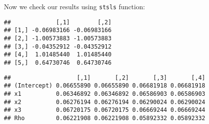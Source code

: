 Now we check our results using \texttt{stsls} function:
\begin{knitrout}
\color{fgcolor}\begin{kframe}
\begin{alltt}
 \hlkwb{<-}  \hlopt{~}  \hlopt{+}  \hlopt{+}     \hlstd{=}   \hlstd{=} \hlstd{))}
 \hlkwb{<-}  \hlopt{~}  \hlopt{+}  \hlopt{+}     \hlstd{=}   \hlstd{=} \hlstd{),}
                 \hlstd{=} \hlstd{,}  \hlstd{=} \hlstd{)}
\hlstd{(}\hlstd{(}\hlstd{(spreg1)[}\hlstd{(}\hlstd{,} \hlstd{,} \hlstd{,} \hlstd{,} \hlstd{)]),} \hlopt{$}
\end{alltt}
\begin{verbatim}
##             [,1]        [,2]
## [1,] -0.06983166 -0.06983166
## [2,] -1.00573883 -1.00573883
## [3,] -0.04352912 -0.04352912
## [4,]  1.01485440  1.01485440
## [5,]  0.64730746  0.64730746
\end{verbatim}
\begin{alltt}
\hlstd{(}\hlstd{(}\hlopt{$}\hlstd{var)[}\hlstd{(}\hlstd{,} \hlstd{,} \hlstd{,} \hlstd{,} \hlstd{)]),}
      \hlstd{(}\hlstd{(}
      \hlstd{(}\hlopt{$}\hlstd{var)[}\hlstd{(}\hlstd{,} \hlstd{,} \hlstd{,} \hlstd{,} \hlstd{)]),}
      \hlstd{(}\hlstd{(}  \hlstd{=} \hlstd{))))}
\end{alltt}
\begin{verbatim}
##                   [,1]       [,2]       [,3]       [,4]
## (Intercept) 0.06655890 0.06655890 0.06681918 0.06681918
## x1          0.06346892 0.06346892 0.06586903 0.06586903
## x2          0.06276194 0.06276194 0.06290024 0.06290024
## x3          0.06720175 0.06720175 0.06669244 0.06669244
## Rho         0.06221908 0.06221908 0.05892332 0.05892332
\end{verbatim}
\end{kframe}
\end{knitrout}

